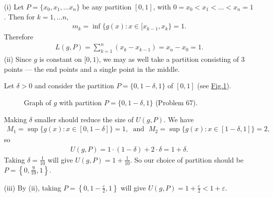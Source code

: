 \documentclass[letterpaper,10pt,english]{jupyterBook}
\let\sphinxpxdimen\pdfpxdimen\else\newdimen\sphinxpxdimen
\begin{document}
\sphinxAtStartPar
(i) Let \(P=\{x_0,x_1,\ldots x_n\}\) be any partition \([0,1]\), with \(0=x_0<x_1<\ldots<x_n=1\). Then for \(k=1,\ldots n\),
\begin{equation*}
\begin{split}
m_k=\inf\{g(x) : x\in[x_{k-1},x_k\} = 1.
\end{split}
\end{equation*}
\sphinxAtStartPar
Therefore
\begin{equation*}
\begin{split}
L(g,P) = \sum_{k=1}^n(x_k-x_{k-1}) = x_n-x_0 = 1.
\end{split}
\end{equation*}
\sphinxAtStartPar
(ii) Since \(g\) is constant on \([0,1)\), we may as well take a partition consisting of 3 points — the end points and a single point in the middle.

\sphinxAtStartPar
Let \(\delta>0\) and consider the partition \(P=\{0,1-\delta,1\}\) of \([0,1]\) (see \hyperref[\detokenize{Solutions-full:q67}]{Fig.\@ \ref{\detokenize{Solutions-full:q67}}}).

\begin{figure}[htbp]
\centering
\capstart

\noindent\sphinxincludegraphics[width=600\sphinxpxdimen]{{q67}.png}
\caption{Graph of \(g\) with partition \(P=\{0,1-\delta,1\}\) (Problem 67).}\label{\detokenize{Solutions-full:q67}}\end{figure}

\sphinxAtStartPar
Making \(\delta\) smaller should reduce the size of \(U(g,P)\). We have
\begin{equation*}
\begin{split}
M_1=\sup\{g(x) : x\in[0,1-\delta]\} = 1, \; \text{ and } \; M_2=\sup\{g(x):x\in[1-\delta,1]\}=2,
\end{split}
\end{equation*}
\sphinxAtStartPar
so
\begin{equation*}
\begin{split}
U(g,P) = 1\cdot(1-\delta) + 2\cdot\delta = 1+\delta.
\end{split}
\end{equation*}
\sphinxAtStartPar
Taking \(\delta=\frac{1}{10}\) will give \(U(g,P)=1+\frac{1}{10}\). So our choice of partition should be \(P=\left\{0,\frac{9}{10},1\right\}\).

\sphinxAtStartPar
(iii) By (ii), taking \(P=\left\{0,1-\frac{\varepsilon}{2},1\right\}\) will give \(U(g,P)=1+\frac{\varepsilon}{2} < 1+\varepsilon\).
\end{document}
